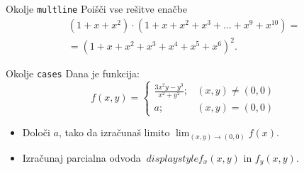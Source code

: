 \begin{frame}{Okolje \texttt{multline}}
	Poišči vse rešitve enačbe
	\begin{multline*}
		(1+x+x^2) \cdot (1+x+x^2+x^3+\ldots+x^9+x^{10}) = \\
		=(1+x+x^2+x^3+x^4+x^5+x^6)^2.
	\end{multline*}
\end{frame}

\begin{frame}{Okolje \texttt{cases}}
	Dana je funkcija:
	\[
	f(x,y)=\begin{cases}
		\frac{3x^2y-y^3}{x^2+y^2}; & (x,y) \neq (0,0) \\
		a; & (x,y) = (0,0)
	\end{cases}
	\]
	
		
	\begin{itemize}
	 
	\item Določi $a$, tako da izračunaš limito \( \lim_{(x,y)\to(0,0)} f(x). \)
	\item Izračunaj parcialna odvoda $\ displaystyle f_x(x,y)$ in $\displaystyle f_y(x,y)$.
	\end{itemize}
\end{frame}